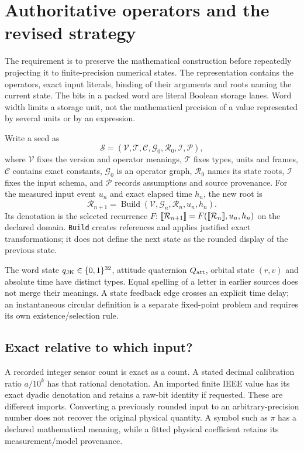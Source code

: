 \section{Authoritative operators and the revised strategy}
\label{sec:exact-strategy}

The requirement is to preserve the mathematical construction before repeatedly
projecting it to finite-precision numerical states. The representation contains
the operators, exact input literals, binding of their arguments and roots naming
the current state. The bits in a packed word are literal Boolean storage lanes.
Word width limits a storage unit, not the mathematical precision of a value
represented by several units or by an expression.

Write a seed as
\[
 \mathcal S=(\mathcal V,\mathcal T,\mathcal C,\mathcal G_0,
             \mathcal R_0,\mathcal I,\mathcal P),
\]
where $\mathcal V$ fixes the version and operator meanings, $\mathcal T$ fixes
types, units and frames, $\mathcal C$ contains exact constants, $\mathcal G_0$
is an operator graph, $\mathcal R_0$ names its state roots, $\mathcal I$ fixes
the input schema, and $\mathcal P$ records assumptions and source provenance.
For the measured input event $u_n$ and exact elapsed time $h_n$, the new root is
\[
 \mathcal R_{n+1}=\operatorname{Build}
       (\mathcal V,\mathcal G_n,\mathcal R_n,u_n,h_n).
\]
Its denotation is the selected recurrence $F$:
$\llbracket \mathcal R_{n+1}\rrbracket=F(\llbracket \mathcal R_n\rrbracket,u_n,h_n)$ on the declared domain.
\texttt{Build} creates references and applies justified exact transformations;
it does not define the next state as the rounded display of the previous state.

The word state $q_{\rm JK}\in\{0,1\}^{32}$, attitude quaternion $Q_{\rm att}$,
orbital state $(r,v)$ and absolute time have distinct types. Equal spelling of a
letter in earlier sources does not merge their meanings. A state feedback edge
crosses an explicit time delay; an instantaneous circular definition is a separate
fixed-point problem and requires its own existence/selection rule.

\subsection{Exact relative to which input?}
A recorded integer sensor count is exact as a count. A stated decimal calibration
ratio $a/10^k$ has that rational denotation. An imported finite IEEE value has its
exact dyadic denotation and retains a raw-bit identity if requested. These are
different imports. Converting a previously rounded input to an arbitrary-precision
number does not recover the original physical quantity. A symbol such as $\pi$
has a declared mathematical meaning, while a fitted physical coefficient retains
its measurement/model provenance.

